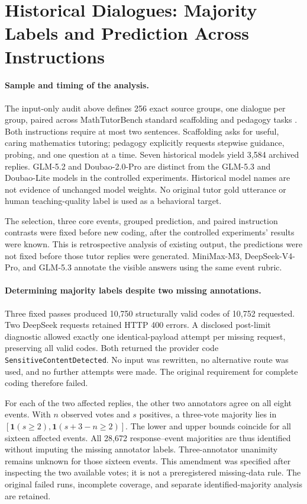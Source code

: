 \section{Historical Dialogues: Majority Labels and Prediction Across Instructions}
\label{app:archive-validation}

\paragraph{Sample and timing of the analysis.}
The input-only audit above defines 256 exact source groups, one dialogue per
group, paired across MathTutorBench standard scaffolding and pedagogy tasks
\citep{macina2025mathtutorbench}.
Both instructions require at most two sentences. Scaffolding asks for useful,
caring mathematics tutoring; pedagogy explicitly requests stepwise guidance,
probing, and one question at a time. Seven historical models yield 3,584
archived replies. GLM-5.2 and Doubao-2.0-Pro are distinct from the GLM-5.3 and
Doubao-Lite models in the controlled experiments. Historical model names
are not evidence of unchanged model weights. No original tutor gold utterance or
human teaching-quality label is used as a behavioral target.

The selection, three core events, grouped prediction, and paired instruction
contrasts were fixed before new coding, after the controlled experiments' results
were known. This is retrospective analysis of existing output, the predictions were not fixed before those tutor replies were generated. MiniMax-M3,
DeepSeek-V4-Pro, and GLM-5.3 annotate the visible answers using the same event rubric.

\paragraph{Determining majority labels despite two missing annotations.}
Three fixed passes produced 10,750 structurally valid codes of 10,752 requested.
Two DeepSeek requests retained HTTP 400 errors. A disclosed post-limit diagnostic
allowed exactly one identical-payload attempt per missing request, preserving
all valid codes. Both returned the provider code \texttt{SensitiveContentDetected}.
No input was rewritten, no alternative route was used, and no further attempts
were made. The original requirement for complete coding therefore failed.

For each of the two affected replies, the other two annotators agree on all eight
events. With $n$ observed votes and $s$ positives, a three-vote majority lies in
$[\mathbf{1}(s\geq2),\mathbf{1}(s+3-n\geq2)]$. The lower and upper bounds coincide for
all sixteen affected events. All 28,672 response--event majorities are thus
identified without imputing the missing annotator labels. Three-annotator unanimity
remains unknown for those sixteen events. This amendment was specified after
inspecting the two available votes; it is not a preregistered missing-data rule.
The original failed runs, incomplete coverage, and separate identified-majority
analysis are retained.

